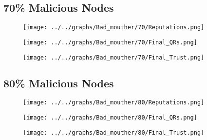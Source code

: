 \begin{minipage}[t]{0.49\columnwidth}
\subsection*{70\% Malicious Nodes}
    \begin{figure}[H]
        \centering
        \texttt{[image: ../../graphs/Bad\_mouther/70/Reputations.png]}
    \end{figure}
    \begin{figure}[H]
        \centering
        \texttt{[image: ../../graphs/Bad\_mouther/70/Final\_QRs.png]}
    \end{figure}
\end{minipage}
\begin{minipage}[t]{0.49\columnwidth}
    \begin{figure}[H]
        \centering
        \texttt{[image: ../../graphs/Bad\_mouther/70/Final\_Trust.png]}
    \end{figure}
\end{minipage}

\begin{minipage}[t]{0.49\columnwidth}
\subsection*{80\% Malicious Nodes}
    \begin{figure}[H]
        \centering
        \texttt{[image: ../../graphs/Bad\_mouther/80/Reputations.png]}
    \end{figure}
    \begin{figure}[H]
        \centering
        \texttt{[image: ../../graphs/Bad\_mouther/80/Final\_QRs.png]}
    \end{figure}
\end{minipage}
\begin{minipage}[t]{0.49\columnwidth}
    \begin{figure}[H]
        \centering
        \texttt{[image: ../../graphs/Bad\_mouther/80/Final\_Trust.png]}
    \end{figure}
\end{minipage}

